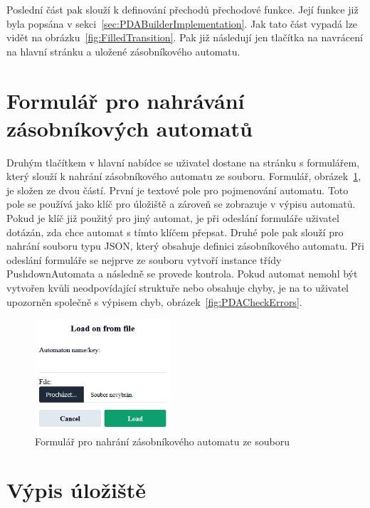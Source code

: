 Poslední část pak slouží k definování přechodů přechodové funkce. Její funkce již byla popsána v sekci~\ref{sec:PDABuilderImplementation}. Jak tato část vypadá lze vidět na obrázku~\ref{fig:FilledTransition}. Pak již následují jen tlačítka na navrácení na hlavní stránku a uložené zásobníkového automatu.

\section{Formulář pro nahrávání zásobníkových automatů}\label{sec:UploadForm}

Druhým tlačítkem v hlavní nabídce se uživatel dostane na stránku s formulářem, který slouží k nahrání zásobníkového automatu ze souboru. Formulář, obrázek~\ref{fig:UploadForm}, je složen ze dvou částí. První je textové pole pro pojmenování automatu. Toto pole se používá jako klíč pro úložiště a zároveň se zobrazuje v výpisu automatů. Pokud je klíč již použitý pro jiný automat, je při odeslání formuláře uživatel dotázán, zda chce automat s tímto klíčem přepsat. Druhé pole pak slouží pro nahrání souboru typu JSON, který obsahuje definici zásobníkového automatu. Při odeslání formuláře se nejprve ze souboru vytvoří instance třídy PushdownAutomata a následně se provede kontrola. Pokud automat nemohl být vytvořen kvůli neodpovídající struktuře nebo obsahuje chyby, je na to uživatel upozorněn společně s výpisem chyb, obrázek~\ref{fig:PDACheckErrors}.

\begin{figure}[h]
    \centering
    \includegraphics[width=0.45\textwidth]{Figures/PrntScrn_UI_Upload.png}
    \caption{Formulář pro nahrání zásobníkového automatu ze souboru}\label{fig:UploadForm}
\end{figure}

\section{Výpis úložiště}\label{sec:StoragePage}

